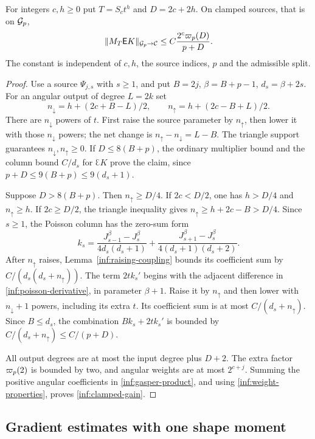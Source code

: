 \begin{lemma}\label{inf:clamped-smoothing}
For integers $c,h\ge0$ put $T=S_ct^h$ and $D=2c+2h$.
On clamped sources, that is on $\mathcal{G}_p$,
\begin{equation}\label{inf:clamped-gain}
 \lVert M_T\mathsf E K\rVert_{\mathcal{G}_p\to\mathcal C}
 \le C\frac{2^c\varpi_p(D)}{p+D}.
\end{equation}
The constant is independent of $c,h$, the source indices, $p$ and
the admissible split.
\end{lemma}
\begin{proof}
Use a source $\Psi_{j,s}$ with $s\ge1$, and put $B=2j$,
$\beta=B+p-1$, $d_s=\beta+2s$.
For an angular output of degree $L=2k$ set
\[
 n_{\downarrow}=h+(2c+B-L)/2,\qquad
 n_{\uparrow}=h+(2c-B+L)/2.
\]
There are $n_{\downarrow}$ powers of $t$. First raise the source
parameter by $n_{\uparrow}$, then lower it with those
$n_{\downarrow}$ powers; the net change is
$n_{\uparrow}-n_{\downarrow}=L-B$.
The triangle support guarantees $n_{\downarrow},n_{\uparrow}\ge0$.
If $D\le8(B+p)$, the ordinary multiplier bound and the column
bound $C/d_s$ for $\Euler K$ prove the claim, since
$p+D\le9(B+p)\le9(d_s+1)$.

Suppose $D>8(B+p)$. Then $n_{\uparrow}\ge D/4$.
If $2c<D/2$, one has $h>D/4$ and $n_{\uparrow}\ge h$.
If $2c\ge D/2$, the triangle inequality gives
$n_{\uparrow}\ge h+2c-B>D/4$.
Since $s\ge1$, the Poisson column has the zero-sum form
\[
 k_s=\frac{J_{s-1}^\beta-J_s^\beta}{4d_s(d_s+1)}
       +\frac{J_{s+1}^\beta-J_s^\beta}{4(d_s+1)(d_s+2)}.
\]
After $n_{\uparrow}$ raises, Lemma~\ref{inf:raising-coupling} bounds its
coefficient sum by $C/(d_s(d_s+n_{\uparrow}))$.
The term $2tk_s'$ begins with the adjacent difference in
\eqref{inf:poisson-derivative}, in parameter $\beta+1$.
Raise it by $n_{\uparrow}$ and then lower with $n_{\downarrow}+1$
powers, including its extra $t$. Its coefficient sum is at most
$C/(d_s+n_{\uparrow})$.
Since $B\le d_s$, the combination $Bk_s+2tk_s'$ is bounded by
$C/(d_s+n_{\uparrow})\le C/(p+D)$.

All output degrees are at most the input degree plus $D+2$.
The extra factor $\varpi_p(2)$ is bounded by two, and angular weights
are at most $2^{c+j}$. Summing the positive angular coefficients
in \eqref{inf:gasper-product}, and using
\eqref{inf:weight-properties}, proves \eqref{inf:clamped-gain}.
\end{proof}

\subsection{Gradient estimates with one shape moment}

